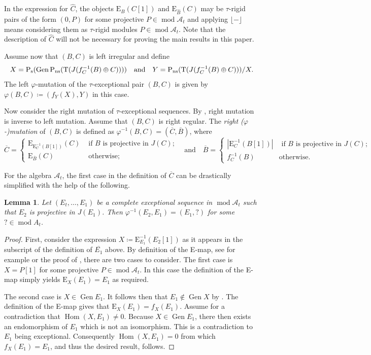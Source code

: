 \documentclass[10pt,twoside, a4paper,reqno]{amsart}
\DeclareMathOperator{\mods}{mod}
\DeclareMathOperator{\Hom}{Hom}
\DeclareMathOperator{\Gen}{Gen}
\newcommand{\A}{\mathscr{A}}
\newcommand{\Trm}{\mathrm{T}}
\newcommand{\Prm}{\mathrm{P}}
\newcommand{\nsplit}{\textnormal{ns}}
\newcommand{\ssplit}{\textnormal{s}}
\newcommand{\Erm}{\mathrm{E}}
\newtheorem{lemma}[theorem]{Lemma}
\theoremstyle{definition}
\begin{document}
In the expression for $\widehat{C}$, the objects $\Erm_B(C[1])$ and $\Erm_{\widehat{B}}(C)$ may be $\tau$-rigid pairs of the form $(0,P)$ for some projective $P\in \mods \A_t$ and applying $\lfloor - \rfloor$ means considering them as $\tau$-rigid modules $P \in \mods \A_t$. Note that the description of $\widehat{C}$ will not be necessary for proving the main results in this paper.

Assume now that $(B,C)$ is left irregular and define 
\[ X = \Prm_{\ssplit}(\Gen \Prm_{\nsplit}(\Trm(J(f_C^{-1}(B) \oplus C)))) \quad \text{and} \quad Y = \Prm_{\nsplit}(\Trm(J(f_C^{-1}(B) \oplus C)))/X.\]
The left $\varphi$-mutation of the $\tau$-exceptional pair $(B,C)$ is given by $\varphi(B,C) \coloneqq (f_Y(X), Y)$ in this case.


Now consider the right mutation of $\tau$-exceptional sequences. By \cite[Thm. 4.7]{BHM2024}, right mutation is inverse to left mutation. Assume that $(B,C)$ is right regular. The \textit{right ($\varphi$-)mutation} of $(B,C)$ is defined as $\varphi^{-1}(B,C) = (\overline{C}, \overline{B})$, where
\[ \overline{C} = \begin{cases} \Erm_{\Erm_C^{-1}(B[1])}(C) & \text{ if $B$ is projective in $J(C)$;} \\ \Erm_{\overline{B}}(C) & \text{ otherwise;} \end{cases} \quad \text{and} \quad \overline{B} = \begin{cases} |\Erm_C^{-1}(B[1])| & \text{ if $B$ is projective in $J(C)$;} \\ f_C^{-1}(B) & \text{otherwise.}\end{cases}\]

For the algebra $\A_t$, the first case in the definition of $\overline{C}$ can be drastically simplified with the help of the following.
\begin{lemma}\label{lem:rightmuthelp}
	Let $(E_t, \dots, E_1)$ be a complete exceptional sequence in $\mods \A_t$ such that $E_2$ is projective in $J(E_1)$. Then $\varphi^{-1}(E_2, E_1) = (E_1, ?)$ for some $? \in \mods A_t$.
\end{lemma}
\begin{proof}
	First, consider the expression $X\coloneqq \Erm_{E_1}^{-1}(E_2[1])$ as it appears in the subscript of the definition of $\overline{E_1}$ above. By definition of the E-map, see for example \cite[Def. 3.5]{BKT2025} or the proof of \cite[Def.-Prop. 4.5]{BHM2024}, there are two cases to consider. The first case is $X= P[1]$ for some projective $P \in \mods \A_t$. In this case the definition of the E-map simply yields $\Erm_X(E_1)=E_1$ as required. 
	
	The second case is $X \in \Gen E_1$. It follows then that $E_1 \not \in \Gen X$ by \cite[Lem. 1.12]{BHM2024}. The definition of the E-map gives that $\Erm_X(E_1) = f_X (E_1)$. Assume for a contradiction that $\Hom(X, E_1) \neq 0$. Because $X \in \Gen E_1$, there then exists an endomorphism of $E_1$ which is not an isomorphism. This is a contradiction to $E_1$ being exceptional. Consequently $\Hom(X, E_1) = 0$ from which $f_{X} (E_1) = E_1$, and thus the desired result, follows.
\end{proof}
\end{document}
